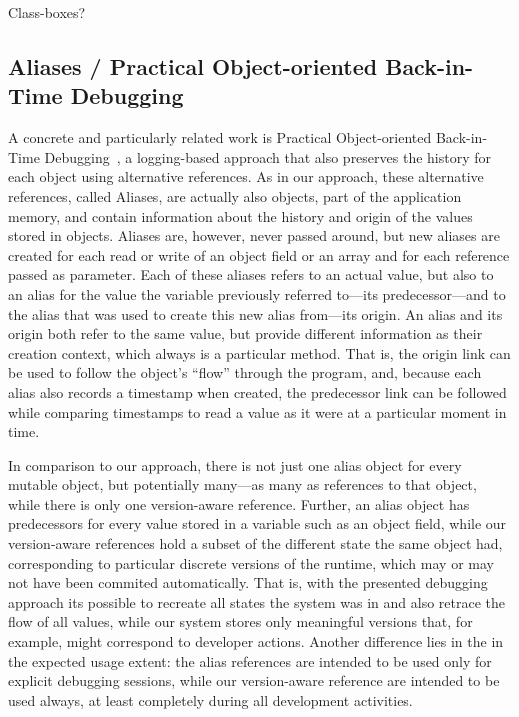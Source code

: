 Class-boxes? 


\subsection{Aliases / Practical Object-oriented Back-in-Time Debugging}

A concrete and particularly related work is Practical Object-oriented Back-in-Time Debugging~\cite{Lienhard2008POB}, a logging-based approach that also preserves the history for each object using alternative references.
As in our approach, these alternative references, called Aliases, are actually also objects, part of the application memory, and contain information about the history and origin of the values stored in objects.
Aliases are, however, never passed around, but new aliases are created for each read or write of an object field or an array and for each reference passed as parameter.
Each of these aliases refers to an actual value, but also to an alias for the value the variable previously referred to---its predecessor---and to the alias that was used to create this new alias from---its origin.
An alias and its origin both refer to the same value, but provide different information as their creation context, which always is a particular method.
That is, the origin link can be used to follow the object's ``flow'' through the program, and, because each alias also records a timestamp when created, the predecessor link can be followed while comparing timestamps to read a value as it were at a particular moment in time.

In comparison to our approach, there is not just one alias object for every mutable object, but potentially many---as many as references to that object, while there is only one version-aware reference.
Further, an alias object has predecessors for every value stored in a variable such as an object field, while our version-aware references hold a subset of the different state the same object had, corresponding to particular discrete versions of the runtime, which may or may not have been commited automatically.
That is, with the presented debugging approach its possible to recreate all states the system was in and also retrace the flow of all values, while our system stores only meaningful versions that, for example, might correspond to developer actions.
Another difference lies in the in the expected usage extent: the alias references are intended to be used only for explicit debugging sessions, while our version-aware reference are intended to be used always, at least completely during all development activities.


